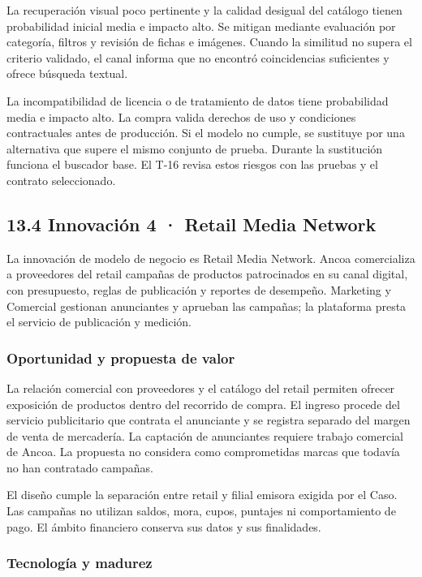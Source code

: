 \documentclass[11pt]{article}
\begin{document}
La recuperación visual poco pertinente y la calidad desigual del catálogo tienen probabilidad inicial media e impacto alto. Se mitigan mediante evaluación por categoría, filtros y revisión de fichas e imágenes. Cuando la similitud no supera el criterio validado, el canal informa que no encontró coincidencias suficientes y ofrece búsqueda textual.

La incompatibilidad de licencia o de tratamiento de datos tiene probabilidad media e impacto alto. La compra valida derechos de uso y condiciones contractuales antes de producción. Si el modelo no cumple, se sustituye por una alternativa que supere el mismo conjunto de prueba. Durante la sustitución funciona el buscador base. El T-16 revisa estos riesgos con las pruebas y el contrato seleccionado.

\subsection{13.4 Innovación 4 · Retail Media Network}\label{innovaciuxf3n-4}

La innovación de modelo de negocio es Retail Media Network. Ancoa comercializa a proveedores del retail campañas de productos patrocinados en su canal digital, con presupuesto, reglas de publicación y reportes de desempeño. Marketing y Comercial gestionan anunciantes y aprueban las campañas; la plataforma presta el servicio de publicación y medición.

\subsubsection{Oportunidad y propuesta de valor}\label{oportunidad-y-propuesta-de-valor}

La relación comercial con proveedores y el catálogo del retail permiten ofrecer exposición de productos dentro del recorrido de compra. El ingreso procede del servicio publicitario que contrata el anunciante y se registra separado del margen de venta de mercadería. La captación de anunciantes requiere trabajo comercial de Ancoa. La propuesta no considera como comprometidas marcas que todavía no han contratado campañas.

El diseño cumple la separación entre retail y filial emisora exigida por el Caso. Las campañas no utilizan saldos, mora, cupos, puntajes ni comportamiento de pago. El ámbito financiero conserva sus datos y sus finalidades.

\subsubsection{Tecnología y madurez}\label{tecnologuxeda-y-madurez-3}
\end{document}
